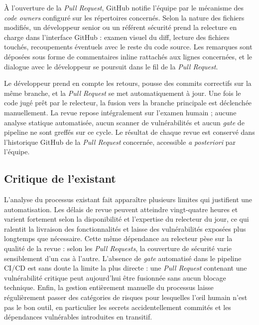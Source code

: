         À l'ouverture de la \textit{Pull Request}, GitHub notifie l'équipe par le
        mécanisme des \textit{code owners} configuré sur les répertoires concernés.
        Selon la nature des fichiers modifiés, un développeur senior ou un référent
        sécurité prend la relecture en charge dans l'interface GitHub : examen visuel
        du diff, lecture des fichiers touchés, recoupements éventuels avec le reste
        du code source. Les remarques sont déposées sous forme de commentaires inline
        rattachés aux lignes concernées, et le dialogue avec le développeur se
        poursuit dans le fil de la \textit{Pull Request}.

        Le développeur prend en compte les retours, pousse des commits correctifs
        sur la même branche, et la \textit{Pull Request} se met automatiquement à
        jour. Une fois le code jugé prêt par le relecteur, la fusion vers la branche
        principale est déclenchée manuellement. La revue repose intégralement sur
        l'examen humain ; aucune analyse statique automatisée, aucun scanner de
        vulnérabilités et aucun \textit{gate} de pipeline ne sont greffés sur ce
        cycle. Le résultat de chaque revue est conservé dans l'historique GitHub
        de la \textit{Pull Request} concernée, accessible \textit{a posteriori} par
        l'équipe.

    \subsection{Critique de l'existant}

        L'analyse du processus existant fait apparaître plusieurs limites qui justifient
        une automatisation. Les délais de revue peuvent atteindre vingt-quatre heures et
        varient fortement selon la disponibilité et l'expertise du relecteur du jour, ce
        qui ralentit la livraison des fonctionnalités et laisse des vulnérabilités
        exposées plus longtemps que nécessaire. Cette même dépendance au relecteur pèse
        sur la qualité de la revue : selon les \textit{Pull Requests}, la couverture de
        sécurité varie sensiblement d'un cas à l'autre. L'absence de \textit{gate} automatisé dans le pipeline CI/CD est sans
        doute la limite la plus directe : une \textit{Pull Request} contenant une
        vulnérabilité critique peut aujourd'hui être fusionnée sans aucun blocage
        technique. Enfin, la gestion entièrement manuelle du processus laisse régulièrement
        passer des catégories de risques pour lesquelles l'œil humain n'est pas le bon
        outil, en particulier les secrets accidentellement commités et les dépendances
        vulnérables introduites en transitif.

